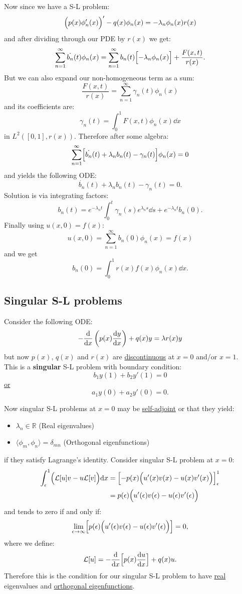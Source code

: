 \documentclass{article}
\begin{document}
\newpage

Now since we have a S-L problem:
$$\Bigl(p(x)\phi'_n(x)\Bigr)'-q(x)\phi_n(x)
=-\lambda_n\phi_n(x)r(x)$$
and after dividing through our PDE by $r(x)$ we get:
$$\sum_{n=1}^{\infty}\dot{b_n}(t)\phi_n(x)
=\sum_{n=1}^{\infty}b_n(t)\Bigl[-\lambda_n\phi_n(x)\Bigr]
+\frac{F(x,t)}{r(x)}.$$
But we can also expand our non-homogeneous term as a sum:
$$\frac{F(x,t)}{r(x)}=\sum_{n=1}^{\infty}\gamma_n(t)\phi_n(x)$$
and its coefficients are:
$$\gamma_n(t)=\int_{0}^{1}F(x,t)\phi_n(x)\dd x$$
in $L^2([0,1],r(x))$. Therefore after some algebra:
$$\sum_{n=1}^{\infty}\Bigl[\dot{b_n}(t)
+\lambda_n b_n(t)-\gamma_n(t)\Bigr]\phi_n(x)=0$$
and yields the following ODE:
$$\dot{b_n}(t)
+\lambda_n b_n(t)-\gamma_n(t)=0.$$
Solution is via integrating factors:
$$b_n(t)=e^{-\lambda_n t}
\int_{0}^{t}\gamma_n(s)e^{\lambda_n s}\dd s
+e^{-\lambda_n t}b_n(0).$$
Finally using $u(x,0)=f(x)$:
$$u(x,0)=\sum_{n=1}^{\infty}b_n(0)\phi_n(x)
=f(x)$$
and we get
$$b_n(0)=\int_{0}^{1}r(x)f(x)\phi_n(x)\dd x.$$
\newpage

\subsection{Singular S-L problems}
Consider the following ODE:
$$-\dv{x}\left(p(x)\dv{y}{x}\right)+q(x)y=\lambda r(x)y$$
but now $p(x)$, $q(x)$ and $r(x)$ are \underline{discontinuous}
at $x=0$ and/or $x=1$. \\
This is a \textbf{singular} S-L problem with boundary condition:
$$b_1 y(1)+b_2 y'(1)=0$$
\underline{or}
$$a_1 y(0)+a_2 y'(0)=0.$$

Now singular S-L problems at $x=0$ may be \underline{self-adjoint} or that they yield:
\begin{itemize}
    \item $\lambda_n\in\mathbb{R}$ (Real eigenvalues)
    \item $\langle \phi_m,\phi_n \rangle=\delta_{mn}$
    (Orthogonal eigenfunctions)
\end{itemize}
if they satisfy Lagrange's identity. Consider singular S-L problem at $x=0$:
\begin{align*}
    \int_{\epsilon}^{1}\Bigl(\mathcal{L}[u]v
    -u\mathcal{L}[v]\Bigr)\dd x
    &=\Bigl[-p(x)
    \Bigl(u'(x)v(x)-u(x)v'(x)\Bigr)\Bigr]_{\epsilon}^{1} \\
    &=p(\epsilon)
    \Bigl(u'(\epsilon)v(\epsilon)-u(\epsilon)v'(\epsilon)\Bigr)
\end{align*}
and tends to zero if and only if:
$$\lim_{\epsilon\rightarrow\infty}
\Bigl[p(\epsilon)
\Bigl(u'(\epsilon)v(\epsilon)-u(\epsilon)v'(\epsilon)\Bigr)\Bigr]=0,$$
where we define:
$$\mathcal{L}[u]=-\dv{x}\Bigl[p(x)\dv{u}{x}\Bigr]+q(x)u.$$
Therefore this is the condition for our singular S-L
problem to have \underline{real} eigenvalues and 
\underline{orthogonal eigenfunctions}.
\end{document}
